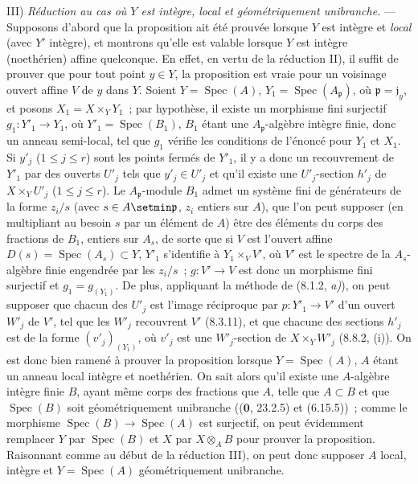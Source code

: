 III) \emph{Réduction au cas où $Y$ est intègre, local et géométriquement
unibranche.} --- Supposons d'abord que la proposition ait été prouvée lorsque $Y$
est intègre et \emph{local} (avec $Y'$ intègre), et montrons qu'elle est valable
lorsque $Y$ est intègre (noethérien) affine quelconque. En effet, en vertu de la
réduction II), il suffit de prouver que pour tout point $y\in Y$, la proposition est
vraie pour un voisinage ouvert affine $V$ de $y$ dans $Y$. Soient $Y=\operatorname{Spec}(A)$,
$Y_1=\operatorname{Spec}(A_{\mathfrak p})$, où $\mathfrak p=\mathfrak j_y$, et posons
$X_1=X\times_Y Y_1$~; par hypothèse, il existe un morphisme fini surjectif
$g_1:Y'_1\to Y_1$, où $Y'_1=\operatorname{Spec}(B_1)$, $B_1$ étant une
$A_{\mathfrak p}$-algèbre intègre finie, donc un anneau semi-local, tel que $g_1$
vérifie les conditions de l'énoncé pour $Y_1$ et $X_1$. Si $y'_j$
($1\leq j\leq r$) sont les points fermés de $Y'_1$, il y a donc un recouvrement de
$Y'_1$ par des ouverts $U'_j$ tels que $y'_j\in U'_j$ et qu'il existe une
$U'_j$-section $h'_j$ de $X\times_Y U'_j$ ($1\leq j\leq r$). Le
$A_{\mathfrak p}$-module $B_1$ admet un système fini de générateurs de la forme
$z_i/s$ (avec $s\in A\setmin\mathfrak p$,
$z_i$ entiers sur $A$), que l'on peut supposer (en multipliant au besoin $s$ par un
élément de $A$) être des éléments du corps des fractions de $B_1$, entiers sur
$A_s$, de sorte que si $V$ est l'ouvert affine $D(s)=\operatorname{Spec}(A_s)\subset Y$, $Y'_1$
s'identifie à $Y_1\times_V V'$, où $V'$ est le spectre de la $A_s$-algèbre finie
engendrée par les $z_i/s$~; $g:V'\to V$ est donc un morphisme fini surjectif et
$g_1=g_{(Y_1)}$. De plus, appliquant la méthode de (8.1.2, \emph{a)}), on peut supposer
que chacun des $U'_j$ est l'image réciproque par $p:Y'_1\to V'$ d'un ouvert $W'_j$
de $V'$, tel que les $W'_j$ recouvrent $V'$ (8.3.11), et que chacune des sections
$h'_j$ est de la forme $(v'_j)_{(Y_1)}$, où $v'_j$ est une $W'_j$-section de
$X\times_Y W'_j$ (8.8.2, (i)). On est donc bien ramené à prouver la proposition
lorsque $Y=\operatorname{Spec}(A)$, $A$ étant un anneau local intègre et noethérien. On sait alors
qu'il existe une $A$-algèbre intègre finie $B$, ayant même corps des fractions que
$A$, telle que $A\subset B$ et que $\operatorname{Spec}(B)$ soit géométriquement unibranche
(($\mathbf 0$, 23.2.5) et (6.15.5))~; comme le morphisme
$\operatorname{Spec}(B)\to\operatorname{Spec}(A)$ est surjectif, on peut évidemment remplacer $Y$ par
$\operatorname{Spec}(B)$ et $X$ par $X\otimes_A B$ pour prouver la proposition. Raisonnant comme
au début de la réduction III), on peut donc supposer $A$ local, intègre et
$Y=\operatorname{Spec}(A)$ géométriquement unibranche.

